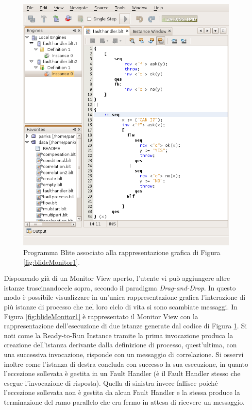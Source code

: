 \begin{figure}[!t]
\begin{center}
\includegraphics[scale=0.79]
{blide/dia/BlideMonitorCode}
\caption[Blide: programma Blite]{Programma Blite associato alla
rappresentazione grafica di Figura \ref{fig:blideMonitor1}.}
  \label{fig:blideMonitorCode}
\end{center}
\end{figure}


Disponendo già di un Monitor View aperto, l'utente vi può aggiungere altre
istanze trascinandocele sopra, secondo il paradigma \emph{Drag-and-Drop}. In
questo modo è possibile visualizzare in un'unica rappresentazione grafica
l'interazione di più istanze di processo che nel loro ciclo di vita si sono
scambiate messaggi. In Figura \ref{fig:blideMonitor1} è rappresentato il
Monitor View con la rappresentazione dell'esecuzione di due istanze generate
dal codice di Figura \ref{fig:blideMonitorCode}. Si noti come la Ready-to-Run
Instance tramite la prima invocazione produca la creazione dell'istanza
derivante dalla definizione di processo, quest'ultima, con una successiva
invocazione, risponde con un messaggio di correlazione. Si osservi inoltre come
l'istanza di destra concluda con successo la sua esecuzione, in quanto
l'eccezione sollevata è gestita in un Fault Handler (è il Fault Handler stesso
che esegue l'invocazione di risposta). Quella di sinistra invece fallisce poiché
l'eccezione sollevata non è gestita da alcun Fault Handler e la stessa produce
la terminazione del ramo parallelo che era fermo in attesa di ricevere un
messaggio. 

